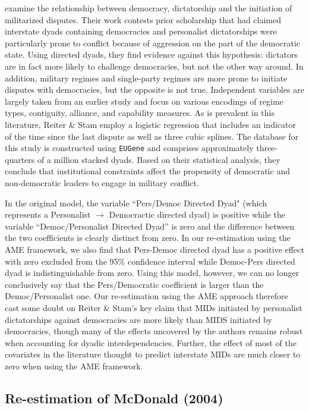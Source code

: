 \documentclass{article}[12pt]
\begin{document}
\citet{reiter:stam:2003} examine the relationship between democracy, dictatorship and the initiation of militarized disputes. Their work contests prior scholarship that had claimed interstate dyads containing democracies and personalist dictatorships were particularly prone to conflict because of aggression on the part of the democratic state. Using directed dyads, they find evidence against this hypothesis: dictators are in fact more likely to challenge democracies, but not the other way around.  In addition, military regimes and single-party regimes are more prone to initiate disputes with democracies, but the opposite is not true. Independent variables are largely taken from an earlier study and focus on various encodings of regime types, contiguity, alliance, and capability measures. As is prevalent in this literature, Reiter \& Stam employ a logistic regression that includes an indicator of the time since the last dispute as well as three cubic splines. The database for this study is constructed using \texttt{EUGene} \citep{bennett:stam:2000} and comprises approximately three-quarters of a million stacked dyads. Based on their statistical analysis, they conclude that institutional constraints affect the propensity of democratic and non-democratic leaders to engage in military conflict. 

In the original model, the variable ``Pers/Democ Directed Dyad" (which represents a Personalist $\rightarrow$ Democractic directed dyad) is positive while the variable ``Democ/Personalist Directed Dyad'' is zero and the difference between the two coefficients is clearly distinct from zero. In our re-estimation using the AME framework, we also find that Pers-Democ directed dyad has a positive effect with zero excluded from the 95\% confidence interval while Democ-Pers directed dyad is indistinguishable from zero. Using this model, however, we can no longer conclusively say that the Pers/Democratic coefficient is larger than the Democ/Personalist one. Our re-estimation using the AME approach therefore cast some doubt on Reiter \& Stam's key claim that MIDs initiated by personalist dictatorships against democracies are more likely than MIDS initiated by democracies, though many of the effects uncovered by the authors remains robust when accounting for dyadic interdependencies. Further, the effect of most of the covariates in the literature thought to predict interstate MIDs are much closer to zero when using the AME framework. 

\subsection{Re-estimation of McDonald (2004)}
\end{document}
